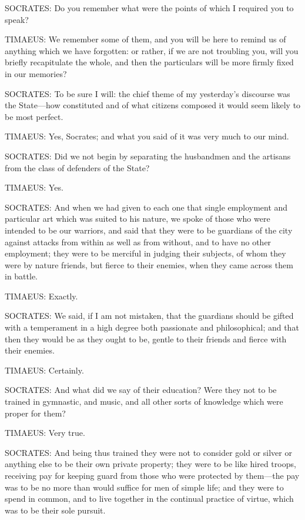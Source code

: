 SOCRATES: Do you remember what were the points of which I required you to
speak?

TIMAEUS: We remember some of them, and you will be here to remind us of
anything which we have forgotten: or rather, if we are not troubling you,
will you briefly recapitulate the whole, and then the particulars will be
more firmly fixed in our memories?

SOCRATES: To be sure I will: the chief theme of my yesterday’s discourse
was the State—how constituted and of what citizens composed it would
seem likely to be most perfect.

TIMAEUS: Yes, Socrates; and what you said of it was very much to our mind.

SOCRATES: Did we not begin by separating the husbandmen and the artisans
from the class of defenders of the State?

TIMAEUS: Yes.

SOCRATES: And when we had given to each one that single employment and
particular art which was suited to his nature, we spoke of those who were
intended to be our warriors, and said that they were to be guardians of
the city against attacks from within as well as from without, and to have
no other employment; they were to be merciful in judging their subjects,
of whom they were by nature friends, but fierce to their enemies, when
they came across them in battle.

TIMAEUS: Exactly.

SOCRATES: We said, if I am not mistaken, that the guardians should be
gifted with a temperament in a high degree both passionate and
philosophical; and that then they would be as they ought to be, gentle to
their friends and fierce with their enemies.

TIMAEUS: Certainly.

SOCRATES: And what did we say of their education? Were they not to be
trained in gymnastic, and music, and all other sorts of knowledge which
were proper for them?

TIMAEUS: Very true.

SOCRATES: And being thus trained they were not to consider gold or silver
or anything else to be their own private property; they were to be like
hired troops, receiving pay for keeping guard from those who were
protected by them—the pay was to be no more than would suffice for
men of simple life; and they were to spend in common, and to live together
in the continual practice of virtue, which was to be their sole pursuit.

